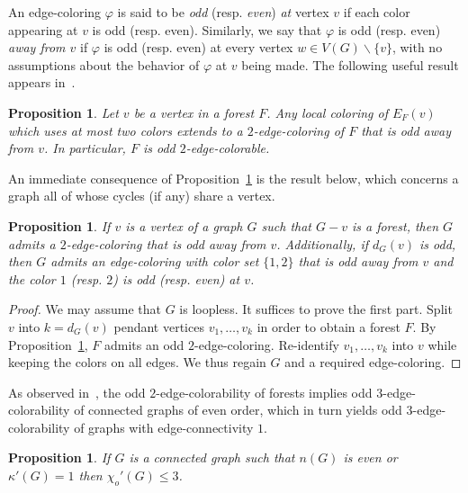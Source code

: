 \documentclass[a4paper,12pt]{article}
\newtheorem{proposition}[theorem]{Proposition}
\numberwithin{equation}{section}
\begin{document}
\smallskip

 An edge-coloring $\varphi$ is said to be \textit{odd} (resp. \textit{even}) \textit{at} vertex $v$ if each color appearing  at $v$ is odd (resp. even). Similarly, we say that $\varphi$ is odd (resp. even) \textit{away from $v$} if $\varphi$ is odd (resp. even) at every vertex $w\in V(G)\backslash\{v\}$, with no assumptions about the behavior of $\varphi$ at $v$ being made.
The following useful result appears in~\cite{Mat06,Pet18}.

\begin{proposition}
    \label{forest}
    Let $v$ be a vertex in a forest $F$. Any local coloring of $E_F(v)$ which uses at most two colors extends to a $2$-edge-coloring of $F$ that is odd away from $v$. In particular, $F$ is odd $2$-edge-colorable.
\end{proposition}


An immediate consequence of Proposition~\ref{forest} is the result below, which concerns a graph all of whose cycles (if any) share a vertex.
 \begin{proposition}
    \label{consequences:forest}
    If $v$ is a vertex of a graph $G$ such that $G-v$ is a forest, then $G$ admits a $2$-edge-coloring that is odd away from $v$. Additionally, if $d_G(v)$ is odd, then $G$ admits an edge-coloring with color set $\{1,2\}$ that is odd away from $v$ and the color $1$ (resp. $2$) is odd (resp. even) at $v$.
 \end{proposition}

 \begin{proof}
 We may assume that $G$ is loopless. It suffices to prove the first part. Split $v$ into $k=d_G(v)$ pendant vertices $v_1,\ldots,v_k$ in order to obtain a forest $F$. By Proposition~\ref{forest}, $F$ admits an odd $2$-edge-coloring. Re-identify $v_1,\ldots,v_k$ into $v$ while keeping the colors on all edges. We thus regain $G$ and a required edge-coloring.
 \end{proof}


As observed in~\cite{Pyb91}, the odd $2$-edge-colorability of forests implies odd $3$-edge-colorability of connected graphs of even order, which in turn yields odd $3$-edge-colorability of graphs with edge-connectivity $1$.
\begin{proposition}
     \label{even order}
If $G$ is a connected graph such that $n(G)$ is even or $\kappa'(G)=1$ then $\chi_{o}'(G)\leq 3$.
\end{proposition}
\end{document}
